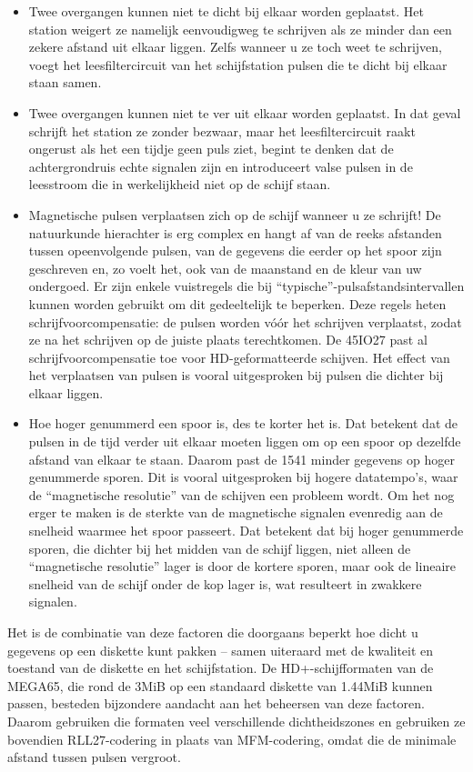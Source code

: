 \begin{itemize}
\item Twee overgangen kunnen niet te dicht bij elkaar worden geplaatst. Het station weigert ze namelijk eenvoudigweg te schrijven als ze minder dan een zekere afstand uit elkaar liggen. Zelfs wanneer u ze toch weet te schrijven, voegt het leesfiltercircuit van het schijfstation pulsen die te dicht bij elkaar staan samen.\item Twee overgangen kunnen niet te ver uit elkaar worden geplaatst. In dat geval schrijft het station ze zonder bezwaar, maar het leesfiltercircuit raakt ongerust als het een tijdje geen puls ziet, begint te denken dat de achtergrondruis echte signalen zijn en introduceert valse pulsen in de leesstroom die in werkelijkheid niet op de schijf staan.\item Magnetische pulsen verplaatsen zich op de schijf wanneer u ze schrijft! De natuurkunde hierachter is erg complex en hangt af van de reeks afstanden tussen opeenvolgende pulsen, van de gegevens die eerder op het spoor zijn geschreven en, zo voelt het, ook van de maanstand en de kleur van uw ondergoed. Er zijn enkele vuistregels die bij ``typische''-pulsafstandsintervallen kunnen worden gebruikt om dit gedeeltelijk te beperken. Deze regels heten schrijfvoorcompensatie: de pulsen worden vóór het schrijven verplaatst, zodat ze na het schrijven op de juiste plaats terechtkomen. De 45IO27 past al schrijfvoorcompensatie toe voor HD-geformatteerde schijven. Het effect van het verplaatsen van pulsen is vooral uitgesproken bij pulsen die dichter bij elkaar liggen.\item Hoe hoger genummerd een spoor is, des te korter het is. Dat betekent dat de pulsen in de tijd verder uit elkaar moeten liggen om op een spoor op dezelfde afstand van elkaar te staan. Daarom past de 1541 minder gegevens op hoger genummerde sporen. Dit is vooral uitgesproken bij hogere datatempo's, waar de ``magnetische resolutie'' van de schijven een probleem wordt. Om het nog erger te maken is de sterkte van de magnetische signalen evenredig aan de snelheid waarmee het spoor passeert. Dat betekent dat bij hoger genummerde sporen, die dichter bij het midden van de schijf liggen, niet alleen de ``magnetische resolutie'' lager is door de kortere sporen, maar ook de lineaire snelheid van de schijf onder de kop lager is, wat resulteert in zwakkere signalen.
\end{itemize}

Het is de combinatie van deze factoren die doorgaans beperkt hoe dicht u gegevens op een diskette kunt pakken -- samen uiteraard met de kwaliteit en toestand van de diskette en het schijfstation. De HD+-schijfformaten van de MEGA65, die rond de 3MiB op een standaard diskette van 1.44MiB kunnen passen, besteden bijzondere aandacht aan het beheersen van deze factoren. Daarom gebruiken die formaten veel verschillende dichtheidszones en gebruiken ze bovendien RLL27-codering in plaats van MFM-codering, omdat die de minimale afstand tussen pulsen vergroot.


